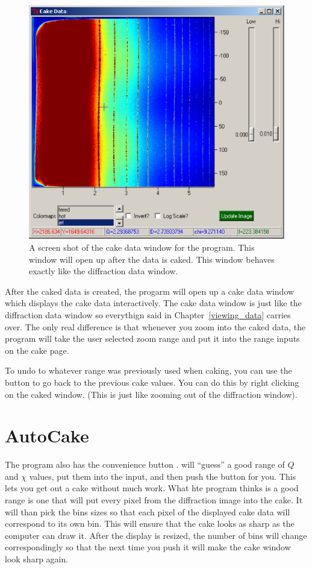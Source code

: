 \begin{figure}
\centering
\includegraphics[scale=.75]{figures/cake_data_window.eps}
\caption{A screen shot of the cake data window for
    the program. This window will open up after the
    data is caked. This window behaves exactly like 
    the diffraction data window.} 
\label{cake_data_window}
\end{figure}
After the caked data is created, the progarm will open up a cake data
window which displays the cake data interactively.
The cake data window is just like the diffraction
data window so everythign said in Chapter~\ref{viewing_data} 
carries over. The only real difference is that whenever
you zoom into the caked data, the program will take the user
selected zoom range and put it into the range inputs on
the cake page.

To undo to whatever range was previously used when caking, 
you can use the  button to go back to the
previous cake values. You can do this by 
right clicking on the caked window. (This is just like
zooming out of the diffraction window). 

\section{AutoCake}

The program also has the convenience button .
 will ``guess'' a good range of $Q$ and $\chi$ 
values, put them into the input, and then push the 
 button for you. This lets you get out a 
cake without much work. What hte program thinks is a
good range is one that will put every pixel from the 
diffraction image into the cake. It will than pick
the bins sizes so that each pixel of the displayed 
cake data will correspond to its own bin. This will ensure
that the cake looks as sharp as the computer can draw it.
After the display is resized, the number of bins will
change correspondingly so that the next time you push
 it will make the cake window look sharp again.

